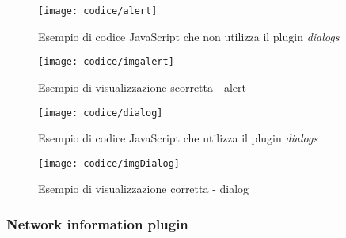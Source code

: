 \begin{figure}[!h] 
    \centering 
    \texttt{[image: codice/alert]} 
    \caption{Esempio di codice JavaScript che non utilizza il plugin \textit{dialogs}}
\end{figure}

\newpage

\begin{figure}[!h] 
    \centering 
    \texttt{[image: codice/imgalert]} 
    \caption{Esempio di visualizzazione scorretta - alert}
\end{figure}

\begin{figure}[!h] 
    \centering 
    \texttt{[image: codice/dialog]} 
    \caption{Esempio di codice JavaScript che utilizza il plugin \textit{dialogs}}
\end{figure}

\begin{figure}[!h] 
    \centering 
    \texttt{[image: codice/imgDialog]} 
    \caption{Esempio di visualizzazione corretta - dialog}
\end{figure}

\subsubsection{Network information plugin}

